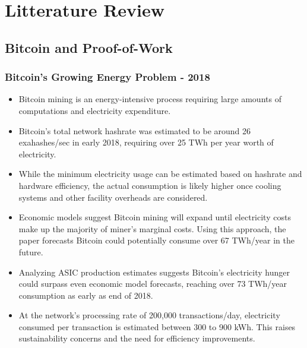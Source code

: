 \documentclass{article}
\begin{document}
\section{Litterature Review}
\subsection{Bitcoin and Proof-of-Work}
\subsubsection*{Bitcoin's Growing Energy Problem - 2018} \cite{devriesBitcoinGrowingEnergy2018}
\begin{itemize}
    \item Bitcoin mining is an energy-intensive process requiring large amounts of computations and electricity expenditure.
    \item Bitcoin's total network hashrate was estimated to be around 26 exahashes/sec in early 2018, requiring over 25 TWh per year worth of electricity.
    \item While the minimum electricity usage can be estimated based on hashrate and hardware efficiency, the actual consumption is likely higher once cooling systems and other facility overheads are considered.
    \item Economic models suggest Bitcoin mining will expand until electricity costs make up the majority of miner's marginal costs. Using this approach, the paper forecasts Bitcoin could potentially consume over 67 TWh/year in the future.
    \item Analyzing ASIC production estimates suggests Bitcoin's electricity hunger could surpass even economic model forecasts, reaching over 73 TWh/year consumption as early as end of 2018.
    \item At the network's processing rate of 200,000 transactions/day, electricity consumed per transaction is estimated between 300 to 900 kWh. This raises sustainability concerns and the need for efficiency improvements.
\end{itemize}
\end{document}
